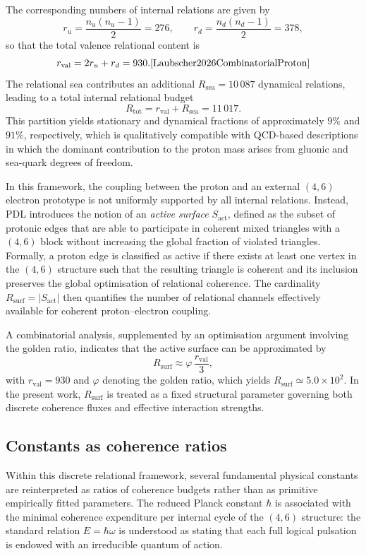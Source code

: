 \documentclass[11pt,a4paper]{article}
\begin{document}
The corresponding numbers of internal relations are given by
\[
r_{u} = \frac{n_{u}(n_{u}-1)}{2} = 276,
\qquad
r_{d} = \frac{n_{d}(n_{d}-1)}{2} = 378,
\]
so that the total valence relational content is
\[
r_{\mathrm{val}} = 2r_{u} + r_{d} = 930.\cite{Laubscher2026CombinatorialProton}
\]
The relational sea contributes an additional $R_{\mathrm{sea}} = 10\,087$ dynamical relations, leading to a total internal relational budget
\[
R_{\mathrm{tot}} = r_{\mathrm{val}} + R_{\mathrm{sea}} = 11\,017.
\]
This partition yields stationary and dynamical fractions of approximately $9\%$ and $91\%$, respectively, which is qualitatively compatible with QCD-based descriptions in which the dominant contribution to the proton mass arises from gluonic and sea-quark degrees of freedom.\cite{Laubscher2026FullPDL}

In this framework, the coupling between the proton and an external $(4,6)$ electron prototype is not uniformly supported by all internal relations.
Instead, PDL introduces the notion of an \emph{active surface} $S_{\mathrm{act}}$, defined as the subset of protonic edges that are able to participate in coherent mixed triangles with a $(4,6)$ block without increasing the global fraction of violated triangles.\cite{Laubscher2026Alpha}
Formally, a proton edge is classified as active if there exists at least one vertex in the $(4,6)$ structure such that the resulting triangle is coherent and its inclusion preserves the global optimisation of relational coherence.
The cardinality $R_{\mathrm{surf}} = |S_{\mathrm{act}}|$ then quantifies the number of relational channels effectively available for coherent proton–electron coupling.

A combinatorial analysis, supplemented by an optimisation argument involving the golden ratio, indicates that the active surface can be approximated by
\[
R_{\mathrm{surf}} \approx \varphi\,\frac{r_{\mathrm{val}}}{3},
\]
with $r_{\mathrm{val}}=930$ and $\varphi$ denoting the golden ratio, which yields $R_{\mathrm{surf}}\simeq 5.0\times 10^{2}$.\cite{Laubscher2026Alpha,Laubscher2026GoldenRatioSurface}
In the present work, $R_{\mathrm{surf}}$ is treated as a fixed structural parameter governing both discrete coherence fluxes and effective interaction strengths.

\subsection{Constants as coherence ratios}

Within this discrete relational framework, several fundamental physical constants are reinterpreted as ratios of coherence budgets rather than as primitive empirically fitted parameters.\cite{Laubscher2026FullPDL}
The reduced Planck constant $\hbar$ is associated with the minimal coherence expenditure per internal cycle of the $(4,6)$ structure: the standard relation $E=\hbar\omega$ is understood as stating that each full logical pulsation is endowed with an irreducible quantum of action.\cite{Laubscher2026IntroPDL,Laubscher2026FullPDL}
\end{document}
